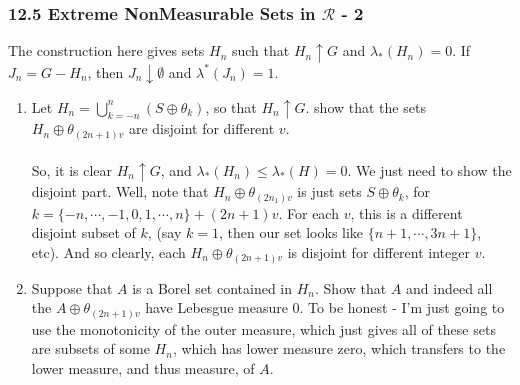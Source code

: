 \documentclass[12pt,a4paper]{article}
\newcommand{\1}[1]{\mathbbm{1}\left\{ #1 \right\}}
\newcommand{\rcal}{\mathcal{R}}
\begin{document}
\subsubsection{12.5 Extreme NonMeasurable Sets in $\rcal$ - 2} The construction here gives sets $H_n$ such that $H_n \uparrow G$ and $\lambda_*(H_n) = 0$. If $J_n = G - H_n$, then $J_n \downarrow \emptyset$ and $\lambda^*(J_n) = 1$.
\begin{enumerate}
	\item Let $H_n = \bigcup_{k=-n}^n (S \oplus \theta_k)$, so that $H_n \uparrow G$. show that the sets $H_n \oplus \theta_{(2n + 1)v}$ are disjoint for different $v$.
	\\\\
	So, it is clear $H_n \uparrow G$, and $\lambda_*(H_n) \leq \lambda_*(H) = 0$. We just need to show the disjoint part. Well, note that $H_n \oplus \theta_{(2n_1)v}$ is just sets $S \oplus \theta_k$, for $k = \{-n, \cdots, -1, 0, 1, \cdots, n\} + (2n + 1)v$. For each $v$, this is a different disjoint subset of $k$, (say $k = 1$, then our set looks like $\{n + 1, \cdots, 3n + 1\}$, etc). And so clearly, each $H_n \oplus \theta_{(2n + 1)v}$ is disjoint for different integer $v$.

	\item Suppose that $A$ is a Borel set contained in $H_n$. Show that $A$ and indeed all the $A \oplus \theta_{(2n + 1)v}$ have Lebesgue measure 0. To be honest - I'm just going to use the monotonicity of the outer measure, which just gives all of these sets are subsets of some $H_n$, which has lower measure zero, which transfers to the lower measure, and thus measure, of $A$.
\end{enumerate}
\end{document}
